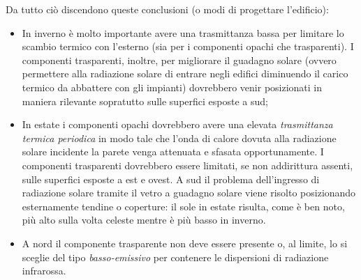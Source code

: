 Da tutto ciò discendono queste conclusioni (o modi di progettare l'edificio):
\begin{itemize}
	\item In inverno è molto importante avere una trasmittanza bassa per limitare lo scambio termico con l'esterno (sia per i componenti opachi che trasparenti). I componenti trasparenti, inoltre, per migliorare il guadagno solare (ovvero permettere alla radiazione solare di entrare negli edifici diminuendo il carico termico da abbattere con gli impianti) dovrebbero venir posizionati in maniera rilevante sopratutto sulle superfici esposte a sud;
	\item In estate i componenti opachi dovrebbero avere una elevata \emph{trasmittanza termica periodica} in modo tale che l'onda di calore dovuta alla radiazione solare incidente la parete venga attenuata e sfasata opportunamente. I componenti trasparenti dovrebbero essere limitati, se non addirittura assenti, sulle superfici esposte a est e ovest. A sud il problema dell'ingresso di radiazione solare tramite il vetro a guadagno solare viene risolto posizionando esternamente tendine o coperture: il sole in estate risulta, come è ben noto, più alto sulla volta celeste mentre è più basso in inverno. 
	\item A nord il componente trasparente non deve essere presente o, al limite, lo si sceglie del tipo \emph{basso-emissivo} per contenere le dispersioni di radiazione infrarossa. 
\end{itemize}